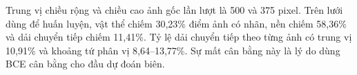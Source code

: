 Trung vị chiều rộng và chiều cao ảnh gốc lần lượt là 500 và 375 pixel. Trên lưới dùng để huấn luyện, vật thể chiếm 30{,}23\% điểm ảnh có nhãn, nền chiếm 58{,}36\% và dải chuyển tiếp chiếm 11{,}41\%. Tỷ lệ dải chuyển tiếp theo từng ảnh có trung vị 10{,}91\% và khoảng tứ phân vị 8{,}64--13{,}77\%. Sự mất cân bằng này là lý do dùng BCE cân bằng cho đầu dự đoán biên.
